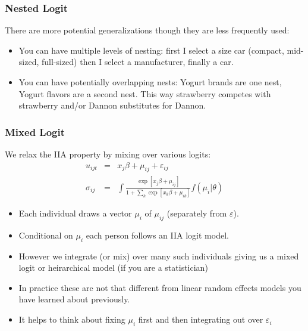 \documentclass[aspectratio=169,11pt]{beamer}
\begin{document}
\begin{frame}
\frametitle{Nested Logit}
There are more potential generalizations though they are less frequently used:
 \begin{itemize}
\item You can have multiple levels of nesting: first I select a size car (compact, mid-sized, full-sized) then I select a manufacturer, finally a car.
\item You can have potentially overlapping nests: Yogurt brands are one nest, Yogurt flavors are a second nest. This way strawberry competes with strawberry and/or Dannon substitutes for Dannon.
 \end{itemize}
\end{frame}


\begin{frame}
\frametitle{Mixed Logit}
We relax the IIA property by mixing over various logits:
\begin{eqnarray*}
u_{ijt} &=& x_j \beta + \mu_{ij} + \varepsilon_{ij} \\
\sigma_{ij} &=& \int \frac{\exp[x_{j} \beta + \mu_{ij} ]}{1+\sum_k \exp[x_{k} \beta + \mu_{ik} ]} f(\mu_i | \theta)
\end{eqnarray*}
 \begin{itemize}
 \item Each individual draws a vector $\mu_i$ of $\mu_{ij}$ (separately from $\varepsilon$).
 \item Conditional on $\mu_i$ each person follows an IIA logit model.
 \item However we integrate (or mix) over many such individuals giving us a \alert{mixed logit} or \alert{heirarchical model} (if you are a statistician)
 \item In practice these are not that different from linear \alert{random effects models} you have learned about previously.
 \item It helps to think about fixing $\mu_i$ first and then integrating out over $\varepsilon_i$
 \end{itemize}
\end{frame}
\end{document}

